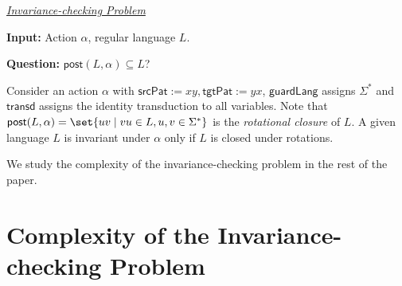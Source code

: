\documentclass[12pt, a4paper]{article}
\newcommand{\T}{\textsf{transd}}
\newcommand{\post}{\textsf{post}}
\newcommand{\spat}{\textsf{srcPat}}
\newcommand{\tpat}{\textsf{tgtPat}}
\newcommand{\guardL}{\textsf{guardLang}}
\newcommand{\action}{\alpha}
\begin{document}
\uline{\emph{Invariance-checking Problem}}

\textbf{Input:} Action $\action$, regular language $L$.

\textbf{Question:} $\post(L, \action) \subseteq L$?

\begin{example}
	Consider an action $\alpha$  with $\spat := xy, \tpat := yx$, $\guardL$ assigns $\Sigma^*$  and $\T$ assigns the identity transduction
	to all variables. Note that $\post(L,\alpha)=\set{uv \mid vu \in L, u, v \in \Sigma^*}$ is the \emph{rotational closure} of $L$. A
	given language $L$ is invariant under $\alpha$ only if $L$ is closed under rotations.
\end{example}

We study the complexity of the invariance-checking problem in the rest of the paper.


\section{Complexity of the Invariance-checking Problem}
\end{document}
